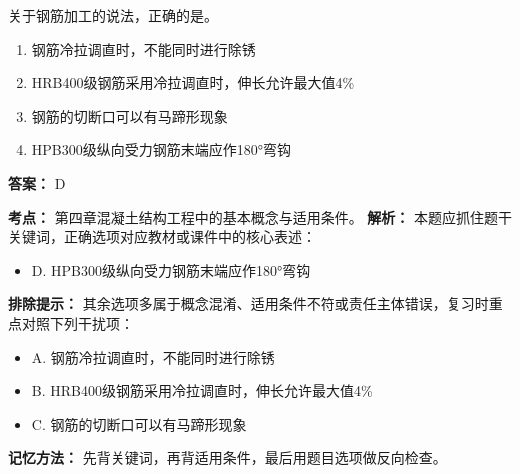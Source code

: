 \documentclass[UTF8,fontset=fandol,11pt]{ctexart}
\begin{document}
\begin{quizbox}[title={第 30 题}]
关于钢筋加工的说法，正确的是。\\
\begin{enumerate}[label=\Alph*.]
\item 钢筋冷拉调直时，不能同时进行除锈
\item HRB400级钢筋采用冷拉调直时，伸长允许最大值4\%
\item 钢筋的切断口可以有马蹄形现象
\item HPB300级纵向受力钢筋末端应作180°弯钩
\end{enumerate}
\textbf{答案：} D
\vspace{0.25em}
\begin{answerbox}[title={考点解析}]
\textbf{考点：} 第四章混凝土结构工程中的基本概念与适用条件。
\textbf{解析：} 本题应抓住题干关键词，正确选项对应教材或课件中的核心表述：
\begin{itemize}
\item D. HPB300级纵向受力钢筋末端应作180°弯钩
\end{itemize}
\textbf{排除提示：} 其余选项多属于概念混淆、适用条件不符或责任主体错误，复习时重点对照下列干扰项：
\begin{itemize}
\item A. 钢筋冷拉调直时，不能同时进行除锈
\item B. HRB400级钢筋采用冷拉调直时，伸长允许最大值4\%
\item C. 钢筋的切断口可以有马蹄形现象
\end{itemize}
\textbf{记忆方法：} 先背关键词，再背适用条件，最后用题目选项做反向检查。
\end{answerbox}
\end{quizbox}

\vspace{0.2em}
\end{document}
